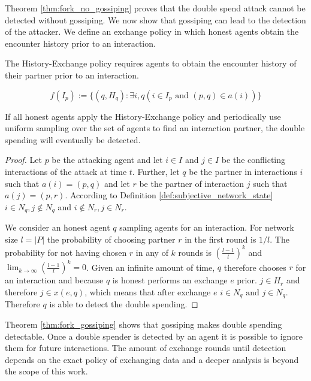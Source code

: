 Theorem \ref{thm:fork_no_gossiping} proves that the double spend attack cannot be
detected without gossiping. We now show that gossiping can lead to the detection of the attacker. We
define an exchange policy in which honest agents obtain the encounter history prior to an interaction.

\begin{pol}
    \label{pol:one}
    The History-Exchange policy requires agents to obtain the encounter history of their partner 
    prior to an interaction. 

    \[ f(I_p) := \{ (q, H_q) : \exists i, q (i \in I_p \text{ and } (p, q) \in a(i)) \}\]
\end{pol}


\begin{thm}
    \label{thm:fork_gossiping}
    If all honest agents apply the History-Exchange policy and periodically use uniform sampling over
    the set of agents to find an interaction partner, the double spending will eventually be detected.
\end{thm}
\begin{proof}
    Let $p$ be the attacking agent and let $i \in I$ and $j \in I$ be the conflicting interactions 
    of the attack at time $t$. Further, let $q$ be the partner in interactions $i$ such that 
    $a(i) = (p, q)$ and let $r$ be the partner of interaction $j$ such that $a(j) = (p, r)$. 
    According to Definition \ref{def:subjective_network_state} $i \in N_{q}, j \notin N_{q}$ and 
    $i \notin N_{r}, j \in N_{r}$.

    We consider an honest agent $q$ sampling agents for an interaction. For network size $l = |P|$ the 
    probability of choosing partner $r$ in the first round is $1/l$. The probability for not having
    chosen $r$ in any of $k$ rounds is $(\frac{l-1}{l})^k$ and $\lim_{k\to\infty}(\frac{l-1}{l})^k = 0$.
    Given an infinite amount of time, $q$ therefore chooses $r$ for an interaction and because $q$ is honest 
    performs an 
    exchange $e$ prior. $j \in H_r$ and therefore $j \in x(e, q)$, which means that after exchange 
    $e$ $i \in N_q \text{ and } j \in N_q$. Therefore $q$ is able to detect the double spending.
\end{proof}

Theorem \ref{thm:fork_gossiping} shows that gossiping makes double spending detectable. Once a double
spender is detected by an agent it is possible to ignore them for future interactions. The amount 
of exchange rounds until detection depends on the exact policy of exchanging data and a deeper 
analysis is beyond the scope of this work.

